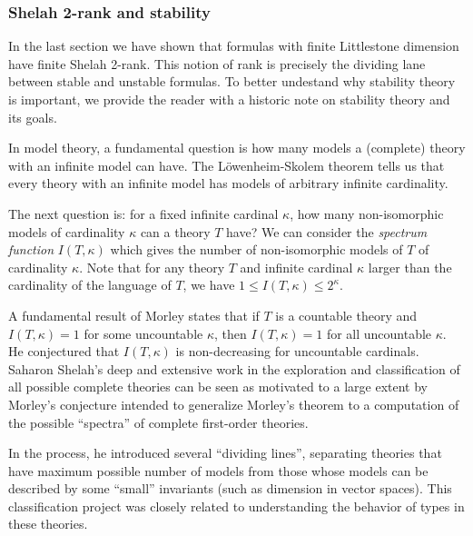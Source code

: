 \subsubsection{Shelah 2-rank and stability}
\label{subsection:stability}
In the last section we have shown that formulas with finite Littlestone dimension have finite Shelah 2-rank. This notion of rank is precisely the dividing lane between stable and unstable formulas. To better undestand why stability theory is important, we provide the reader with a historic note on stability theory and its goals.

\begin{remark}
\begin{outline}
    \0 In model theory, a fundamental question is how many models a (complete) theory with an infinite model can have. The Löwenheim-Skolem theorem tells us that every theory with an infinite model has models of arbitrary infinite cardinality.
    
    \0 The next question is: for a fixed infinite cardinal $\kappa$, how many non-isomorphic models of cardinality $\kappa$ can a theory $T$ have? We can consider the \emph{spectrum function} $I(T,\kappa)$ which gives the number of non-isomorphic models of $T$ of cardinality $\kappa$. Note that for any theory $T$ and infinite cardinal $\kappa$ larger than the cardinality of the language of $T$, we have $1 \leq I(T,\kappa) \leq 2^\kappa$.

    \0 A fundamental result of Morley states that if $T$ is a countable theory and $I(T,\kappa)=1$ for some uncountable $\kappa$, then $I(T,\kappa)=1$ for all uncountable $\kappa$. He conjectured that $I(T,\kappa)$ is non-decreasing for uncountable cardinals. Saharon Shelah's deep and extensive work in the exploration and classification of all possible complete theories can be seen as motivated to a large extent by Morley's conjecture intended to generalize Morley's theorem to a computation of the possible \enquote{spectra} of complete first-order theories. 
    
    \0 In the process, he introduced several \enquote{dividing lines}, separating theories that have maximum possible number of models from those whose models can be described by some \enquote{small} invariants (such as dimension in vector spaces). This classification project was closely related to understanding the behavior of types in these theories.
    

\end{outline}
\end{remark}

